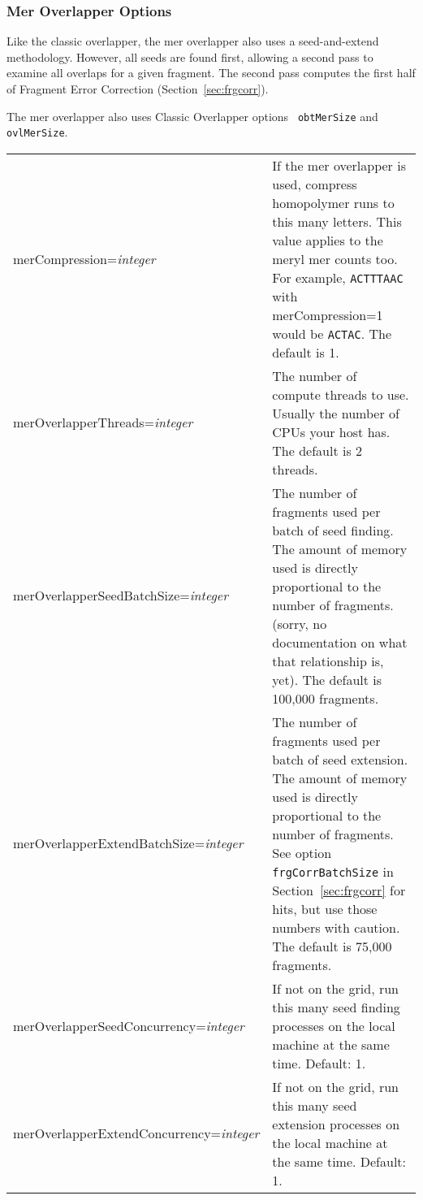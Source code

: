 \documentclass[twoside,11pt]{article}
\begin{document}
\subsubsection{Mer Overlapper Options}

Like the classic overlapper, the mer overlapper also uses a
seed-and-extend methodology.  However, all seeds are found first,
allowing a second pass to examine all overlaps for a given fragment.
The second pass computes the first half of Fragment Error Correction
(Section~\ref{sec:frgcorr}).

The mer overlapper also uses Classic Overlapper options {\tt
obtMerSize} and {\tt ovlMerSize}.

\begin{longtable}{lp{3.0in}}
merCompression={\it integer} &
If the mer overlapper is used, compress homopolymer runs to this many
letters.  This value applies to the meryl mer counts too.  For
example, {\tt ACTTTAAC} with merCompression=1 would be {\tt ACTAC}.
The default is 1.
\\

merOverlapperThreads={\it integer} &
The number of compute threads to use.  Usually the number of CPUs your
host has.
The default is 2 threads.
\\

merOverlapperSeedBatchSize={\it integer} &
The number of fragments used per batch of seed finding.  The amount
of memory used is directly proportional to the number of fragments.
(sorry, no documentation on what that relationship is, yet).
The default is 100,000 fragments.
\\

merOverlapperExtendBatchSize={\it integer} &
The number of fragments used per batch of seed extension.  The amount
of memory used is directly proportional to the number of fragments.
See option {\tt frgCorrBatchSize} in Section~\ref{sec:frgcorr} for
hits, but use those numbers with caution.
The default is 75,000 fragments.
\\

merOverlapperSeedConcurrency={\it integer} &
If not on the grid, run this many seed finding processes on the local machine at the same time.  Default: 1.
\\

merOverlapperExtendConcurrency={\it integer} &
If not on the grid, run this many seed extension processes on the local machine at the same time.  Default: 1.
\\

\end{longtable}
\end{document}
